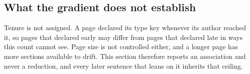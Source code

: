 \subsection{What the gradient does not establish}
Tenure is not assigned. A page declared its type key whenever its author reached it, so pages that declared early may differ from pages that declared late in ways this count cannot see. Page size is not controlled either, and a longer page has more sections available to drift. This section therefore reports an association and never a reduction, and every later sentence that leans on it inherits that ceiling.
